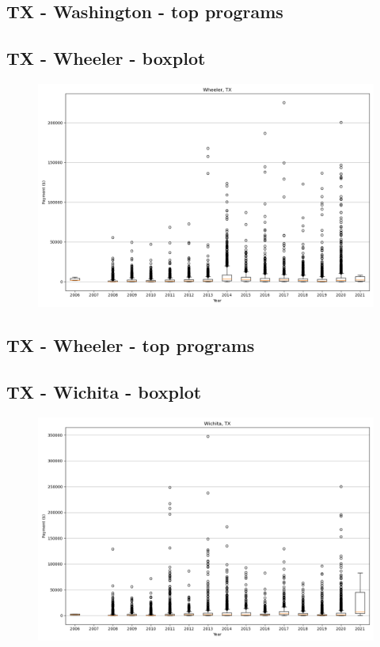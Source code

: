 \subsection*{TX - Washington - top programs}

\newpage
\subsection*{TX - Wheeler - boxplot}
\begin{figure}[h]
\centering
\includegraphics[width=7in]{../output/boxplots/counties/Wheeler-TX_boxplot.png}
\end{figure}


\subsection*{TX - Wheeler - top programs}

\newpage
\subsection*{TX - Wichita - boxplot}
\begin{figure}[h]
\centering
\includegraphics[width=7in]{../output/boxplots/counties/Wichita-TX_boxplot.png}
\end{figure}


